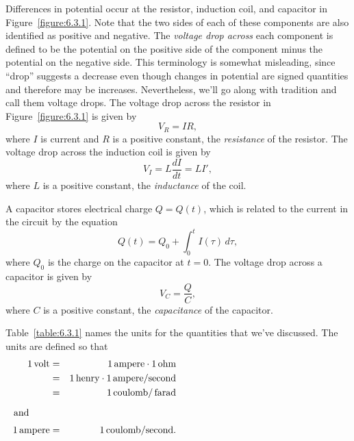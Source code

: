 Differences in potential occur at the resistor, induction coil, and capacitor in
Figure~\ref{figure:6.3.1}. Note that the two sides of each of these components are also identified
as positive and negative. The {\color{blue}\it voltage drop across\/} each component is defined to
be the potential on the positive side of the component minus the potential on the negative side.
This terminology is somewhat misleading, since ``drop'' suggests a decrease even though changes in
potential are signed quantities and therefore may be increases. Nevertheless, we'll go along with
tradition and call them voltage drops. The voltage drop across the resistor in
Figure~\ref{figure:6.3.1} is given by
\begin{equation}
  \label{eq:6.3.1}V_{R}=IR,
\end{equation}
where $I$ is current and $R$ is a positive constant, the {\color{blue}\it resistance\/} of the
resistor. The voltage drop across the induction coil is given by
\begin{equation}
  \label{eq:6.3.2}V_{I}=L\frac{dI}{dt}=LI',
\end{equation}
where $L$ is a positive constant, the {\color{blue}\it inductance\/} of the coil.

A capacitor stores electrical charge $Q=Q(t)$, which is related to the current in the circuit by the
equation
\begin{equation}
  \label{eq:6.3.3}Q(t)=Q_{0}+\int_{0}^{t}I(\tau)\,d\tau,
\end{equation}
where $Q_{0}$ is the charge on the capacitor at $t=0$. The voltage drop across a capacitor is given
by
\begin{equation}
  \label{eq:6.3.4}V_{C}=\frac{Q}{C},
\end{equation}
where $C$ is a positive constant, the {\color{blue}\it capacitance\/} of the capacitor.

Table~\ref{table:6.3.1} names the units for the quantities that we've discussed. The units are
defined so that
\begin{eqnarray*}
  1\mbox{\,volt}   & = & 1\mbox{\,ampere}\cdot1\mbox{\,ohm}                 \\
                   & = & 1\mbox{\,henry}\cdot1\,\mbox{ampere}/\mbox{second} \\
                   & = & 1\mbox{\,coulomb}/\mbox{\,farad}                   \\[2\jot]
  \arraytext{and}                                                           \\
  1\mbox{\,ampere} & = & 1\mbox{\,coulomb}/\mbox{second}.
\end{eqnarray*}

